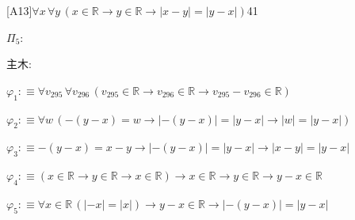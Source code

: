 \begin{fullproof}{[A13]}{$\forall x\,\forall y\,(x \in \mathbb{R} \to y \in \mathbb{R} \to \lvert x - y \rvert = \lvert y - x \rvert)$}{41}
\begin{ptree}
\end{ptree}
\noindent$\Pi_{5}$:
\begin{ptree}
\end{ptree}
\noindent 主木:
\begin{ptree}
\noLine
{}
\noLine
{}
\noLine
{}
\noLine
{}
\end{ptree}
\begin{abbrevlist}
\item $\varphi_{1} :\equiv \forall v_{295}\,\forall v_{296}\,(v_{295} \in \mathbb{R} \to v_{296} \in \mathbb{R} \to v_{295} - v_{296} \in \mathbb{R})$
\item $\varphi_{2} :\equiv \forall w\,(-(y - x) = w \to \lvert -(y - x) \rvert = \lvert y - x \rvert \to \lvert w \rvert = \lvert y - x \rvert)$
\item $\varphi_{3} :\equiv -(y - x) = x - y \to \lvert -(y - x) \rvert = \lvert y - x \rvert \to \lvert x - y \rvert = \lvert y - x \rvert$
\item $\varphi_{4} :\equiv (x \in \mathbb{R} \to y \in \mathbb{R} \to x \in \mathbb{R}) \to x \in \mathbb{R} \to y \in \mathbb{R} \to y - x \in \mathbb{R}$
\item $\varphi_{5} :\equiv \forall x \in \mathbb{R}\,(\lvert -x \rvert = \lvert x \rvert) \to y - x \in \mathbb{R} \to \lvert -(y - x) \rvert = \lvert y - x \rvert$

\end{abbrevlist}
\end{fullproof}
